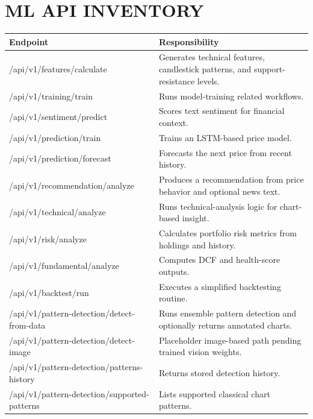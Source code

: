 \documentclass[12pt,a4paper]{report}
\begin{document}
\chapter{ML API INVENTORY}
\begin{longtable}{p{} p{}}
\textbf{Endpoint} & \textbf{Responsibility} \\
\hline
/api/v1/features/calculate & Generates technical features, candlestick patterns, and support-resistance levels. \\
/api/v1/training/train & Runs model-training related workflows. \\
/api/v1/sentiment/predict & Scores text sentiment for financial context. \\
/api/v1/prediction/train & Trains an LSTM-based price model. \\
/api/v1/prediction/forecast & Forecasts the next price from recent history. \\
/api/v1/recommendation/analyze & Produces a recommendation from price behavior and optional news text. \\
/api/v1/technical/analyze & Runs technical-analysis logic for chart-based insight. \\
/api/v1/risk/analyze & Calculates portfolio risk metrics from holdings and history. \\
/api/v1/fundamental/analyze & Computes DCF and health-score outputs. \\
/api/v1/backtest/run & Executes a simplified backtesting routine. \\
/api/v1/pattern-detection/detect-from-data & Runs ensemble pattern detection and optionally returns annotated charts. \\
/api/v1/pattern-detection/detect-image & Placeholder image-based path pending trained vision weights. \\
/api/v1/pattern-detection/patterns-history & Returns stored detection history. \\
/api/v1/pattern-detection/supported-patterns & Lists supported classical chart patterns. \\
\end{longtable}
\end{document}
